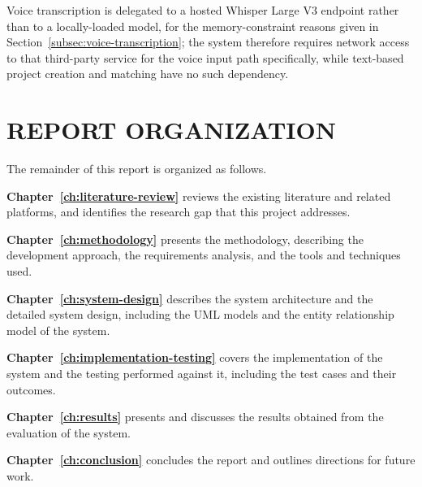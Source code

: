 Voice transcription is delegated to a hosted Whisper Large V3 endpoint rather
than to a locally-loaded model, for the memory-constraint reasons given
in Section~\ref{subsec:voice-transcription}; the system therefore
requires network access to that third-party service for the voice input
path specifically, while text-based project creation and matching have
no such dependency.

\section{REPORT ORGANIZATION}
\label{sec:report-organization}

The remainder of this report is organized as follows.

\textbf{Chapter~\ref{ch:literature-review}} reviews the existing
literature and related platforms, and identifies the research gap that
this project addresses.

\textbf{Chapter~\ref{ch:methodology}} presents the methodology,
describing the development approach, the requirements analysis, and the
tools and techniques used.

\textbf{Chapter~\ref{ch:system-design}} describes the system
architecture and the detailed system design, including the UML models
and the entity relationship model of the system.

\textbf{Chapter~\ref{ch:implementation-testing}} covers the
implementation of the system and the testing performed against it,
including the test cases and their outcomes.

\textbf{Chapter~\ref{ch:results}} presents and discusses the results
obtained from the evaluation of the system.

\textbf{Chapter~\ref{ch:conclusion}} concludes the report and outlines
directions for future work.
